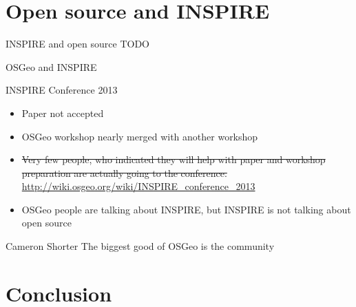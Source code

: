 \documentclass[xcolor=dvipsnames]{beamer}
\begin{document}
\section{Open source and INSPIRE}
\begin{frame}{INSPIRE and open source}
    \LARGE{TODO}
\end{frame}

\begin{frame}{OSGeo and INSPIRE}



    INSPIRE Conference 2013
    \begin{itemize}
        \item Paper not accepted
        \item OSGeo workshop nearly merged with another workshop
        \item \sout{Very few people, who indicated they will help with paper and
            workshop preparation are actually going to the conference.}
            \url{http://wiki.osgeo.org/wiki/INSPIRE_conference_2013}
        \item OSGeo people are talking about INSPIRE, but INSPIRE is not talking
            about open source
    \end{itemize}
    \pause

    \begin{block}{Cameron Shorter}
        The biggest good of OSGeo is the community
    \end{block}


\end{frame}



\section*{Conclusion}
\end{document}
